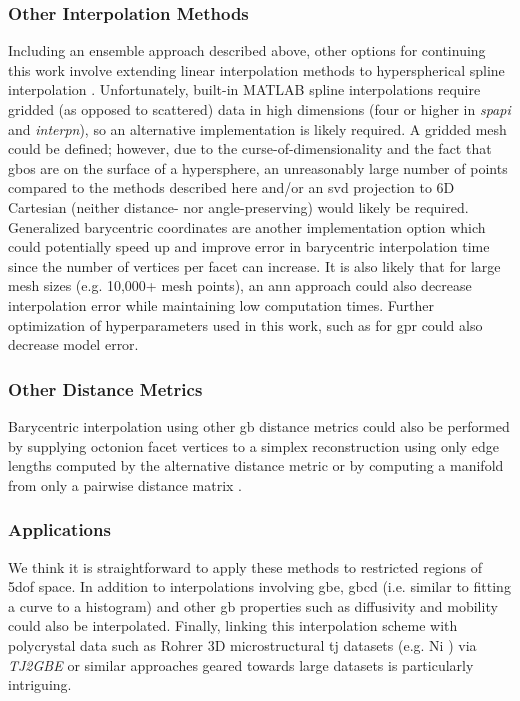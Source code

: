\documentclass[preprint,12pt]{elsarticle}
\begin{document}
\subsubsection{Other Interpolation Methods}
Including an ensemble approach described above, other options for continuing this work involve extending linear interpolation methods to hyperspherical spline interpolation \cite{taijeronSplineInterpolationSmoothing1994}. Unfortunately, built-in MATLAB spline interpolations require gridded (as opposed to scattered) data in high dimensions (four or higher in \textit{spapi} and \textit{interpn}), so an alternative implementation is likely required. A gridded mesh could be defined; however, due to the curse-of-dimensionality and the fact that \glspl{gbo} are on the surface of a hypersphere, an unreasonably large number of points compared to the methods described here and/or an \gls{svd} projection to 6D Cartesian (neither distance- nor angle-preserving) would likely be required. Generalized barycentric coordinates \cite{floaterGeneralizedBarycentricCoordinates2015,meyerGeneralizedBarycentricCoordinates2002,langerSphericalBarycentricCoordinates2006} are another implementation option which could potentially speed up and improve error in barycentric interpolation time since the number of vertices per facet can increase. It is also likely that for large mesh sizes (e.g. 10,000+ mesh points), an \gls{ann} approach \cite{echeverrirestrepoUsingArtificialNeural2014} could also decrease interpolation error while maintaining low computation times. Further optimization of hyperparameters used in this work, such as for \gls{gpr} could also decrease model error.

\subsubsection{Other  Distance Metrics}
Barycentric interpolation using other \gls{gb} distance metrics \cite{morawiecDistancesGrainInterfaces2019} could also be performed by supplying octonion facet vertices to a simplex reconstruction using only edge lengths computed by the alternative distance metric \cite{connorHighdimensionalSimplexesSupermetric2017} or by computing a manifold from only a pairwise distance matrix \cite{boissonnatOnlyDistancesAre2017}.

\subsubsection{Applications}
We think it is straightforward to apply these methods to restricted regions of \gls{5dof} space. In addition to interpolations involving \gls{gbe}, \gls{gbcd} (i.e. similar to fitting a curve to a histogram) and other \gls{gb} properties such as diffusivity and mobility could also be interpolated. Finally, linking this interpolation scheme with polycrystal data such as Rohrer 3D microstructural \gls{tj} datasets (e.g. Ni \cite{liRelativeGrainBoundary2009}) via \textit{TJ2GBE} \cite{shenDeterminingGrainBoundary2019} or similar approaches geared towards large datasets is particularly intriguing.
\end{document}
